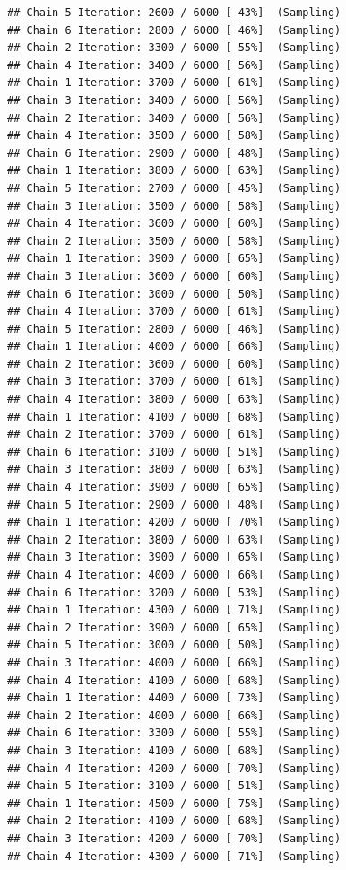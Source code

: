\documentclass[
]{article}
\begin{document}
\begin{verbatim}
## Chain 5 Iteration: 2600 / 6000 [ 43%]  (Sampling) 
## Chain 6 Iteration: 2800 / 6000 [ 46%]  (Sampling) 
## Chain 2 Iteration: 3300 / 6000 [ 55%]  (Sampling) 
## Chain 4 Iteration: 3400 / 6000 [ 56%]  (Sampling) 
## Chain 1 Iteration: 3700 / 6000 [ 61%]  (Sampling) 
## Chain 3 Iteration: 3400 / 6000 [ 56%]  (Sampling) 
## Chain 2 Iteration: 3400 / 6000 [ 56%]  (Sampling) 
## Chain 4 Iteration: 3500 / 6000 [ 58%]  (Sampling) 
## Chain 6 Iteration: 2900 / 6000 [ 48%]  (Sampling) 
## Chain 1 Iteration: 3800 / 6000 [ 63%]  (Sampling) 
## Chain 5 Iteration: 2700 / 6000 [ 45%]  (Sampling) 
## Chain 3 Iteration: 3500 / 6000 [ 58%]  (Sampling) 
## Chain 4 Iteration: 3600 / 6000 [ 60%]  (Sampling) 
## Chain 2 Iteration: 3500 / 6000 [ 58%]  (Sampling) 
## Chain 1 Iteration: 3900 / 6000 [ 65%]  (Sampling) 
## Chain 3 Iteration: 3600 / 6000 [ 60%]  (Sampling) 
## Chain 6 Iteration: 3000 / 6000 [ 50%]  (Sampling) 
## Chain 4 Iteration: 3700 / 6000 [ 61%]  (Sampling) 
## Chain 5 Iteration: 2800 / 6000 [ 46%]  (Sampling) 
## Chain 1 Iteration: 4000 / 6000 [ 66%]  (Sampling) 
## Chain 2 Iteration: 3600 / 6000 [ 60%]  (Sampling) 
## Chain 3 Iteration: 3700 / 6000 [ 61%]  (Sampling) 
## Chain 4 Iteration: 3800 / 6000 [ 63%]  (Sampling) 
## Chain 1 Iteration: 4100 / 6000 [ 68%]  (Sampling) 
## Chain 2 Iteration: 3700 / 6000 [ 61%]  (Sampling) 
## Chain 6 Iteration: 3100 / 6000 [ 51%]  (Sampling) 
## Chain 3 Iteration: 3800 / 6000 [ 63%]  (Sampling) 
## Chain 4 Iteration: 3900 / 6000 [ 65%]  (Sampling) 
## Chain 5 Iteration: 2900 / 6000 [ 48%]  (Sampling) 
## Chain 1 Iteration: 4200 / 6000 [ 70%]  (Sampling) 
## Chain 2 Iteration: 3800 / 6000 [ 63%]  (Sampling) 
## Chain 3 Iteration: 3900 / 6000 [ 65%]  (Sampling) 
## Chain 4 Iteration: 4000 / 6000 [ 66%]  (Sampling) 
## Chain 6 Iteration: 3200 / 6000 [ 53%]  (Sampling) 
## Chain 1 Iteration: 4300 / 6000 [ 71%]  (Sampling) 
## Chain 2 Iteration: 3900 / 6000 [ 65%]  (Sampling) 
## Chain 5 Iteration: 3000 / 6000 [ 50%]  (Sampling) 
## Chain 3 Iteration: 4000 / 6000 [ 66%]  (Sampling) 
## Chain 4 Iteration: 4100 / 6000 [ 68%]  (Sampling) 
## Chain 1 Iteration: 4400 / 6000 [ 73%]  (Sampling) 
## Chain 2 Iteration: 4000 / 6000 [ 66%]  (Sampling) 
## Chain 6 Iteration: 3300 / 6000 [ 55%]  (Sampling) 
## Chain 3 Iteration: 4100 / 6000 [ 68%]  (Sampling) 
## Chain 4 Iteration: 4200 / 6000 [ 70%]  (Sampling) 
## Chain 5 Iteration: 3100 / 6000 [ 51%]  (Sampling) 
## Chain 1 Iteration: 4500 / 6000 [ 75%]  (Sampling) 
## Chain 2 Iteration: 4100 / 6000 [ 68%]  (Sampling) 
## Chain 3 Iteration: 4200 / 6000 [ 70%]  (Sampling) 
## Chain 4 Iteration: 4300 / 6000 [ 71%]  (Sampling) 

\end{verbatim}
\end{document}
